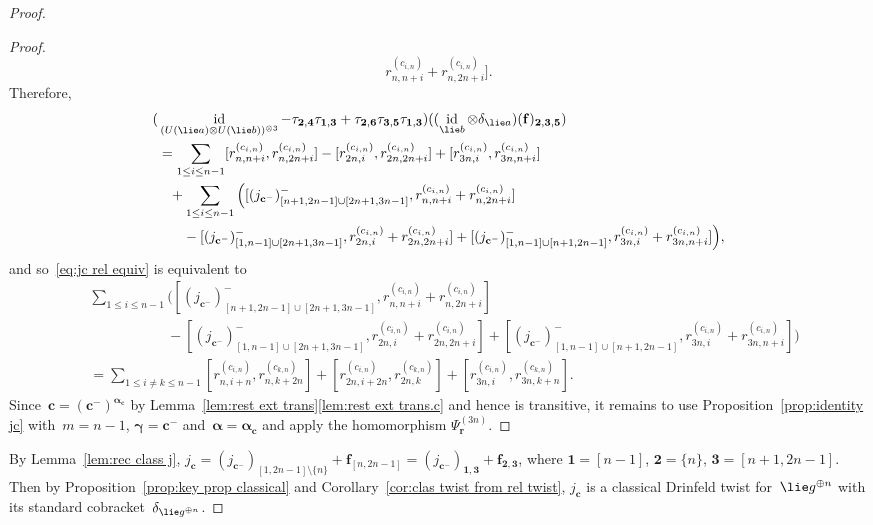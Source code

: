 \documentclass[12pt, reqno]{amsart}
\theoremstyle{definition}
\numberwithin{equation}{section}
\newcommand{\tensor}{\otimes}
\DeclareMathOperator{\id}{id}
\begin{document}
\begin{proof}
\begin{proof}
$$r_{n,n+i}^{(c_{i,n})}+r_{n,2n+i}^{(c_{i,n})}].
$$
Therefore,
\begin{align*}
(&\id_{(U(\lie a)\tensor U(\lie b))^{\tensor3}}-\tau_{\mathbf 2,\mathbf 4}\tau_{\mathbf 1,\mathbf 3}+\tau_{\mathbf 2,\mathbf 6}\tau_{\mathbf 3,\mathbf 5}\tau_{\mathbf 1,\mathbf 3})((\id_{\lie b}\tensor \delta_{\lie a})(\mathbf f)_{\mathbf 2,\mathbf 3,\mathbf 5})\\
&=\sum_{1\le i\le n-1} 
[r_{n,n+i}^{(c_{i,n})},r_{n,2n+i}^{(c_{i,n})}]-
[r_{2n,i}^{(c_{i,n})},r_{2n,2n+i}^{(c_{i,n})}]
+[r_{3n,i}^{(c_{i,n})},r_{3n,n+i}^{(c_{i,n})}]\\
&\phantom{=}+\sum_{1\le i\le n-1}\Big([( j_{\mathbf c^-})^-_{[n+1,2n-1]\cup[2n+1,3n-1]},
r_{n,n+i}^{(c_{i,n})}+r_{n,2n+i}^{(c_{i,n})}]\\
&\phantom{=}\quad-[( j_{\mathbf c^-})^-_{[1,n-1]\cup[2n+1,3n-1]},
r_{2n,i}^{(c_{i,n})}+r_{2n,2n+i}^{(c_{i,n})}]+[( j_{\mathbf c^-})^-_{[1,n-1]\cup[n+1,2n-1]},
r_{3n,i}^{(c_{i,n})}+r_{3n,n+i}^{(c_{i,n})}]\Big),
\end{align*}
and so~\eqref{eq:jc rel equiv} is equivalent to
\begin{align*}
&\sum_{1\le i\le n-1}\Big([( j_{\mathbf c^-})^-_{[n+1,2n-1]\cup[2n+1,3n-1]},
r_{n,n+i}^{(c_{i,n})}+r_{n,2n+i}^{(c_{i,n})}]\\
&\phantom{\sum_{1\le i\le n-1}}-[( j_{\mathbf c^-})^-_{[1,n-1]\cup[2n+1,3n-1]},
r_{2n,i}^{(c_{i,n})}+r_{2n,2n+i}^{(c_{i,n})}]+[( j_{\mathbf c^-})^-_{[1,n-1]\cup[n+1,2n-1]},
r_{3n,i}^{(c_{i,n})}+r_{3n,n+i}^{(c_{i,n})}]\Big)\\
&=\sum_{1\le i\not=k\le n-1} [r_{n,i+n}^{(c_{i,n})},r_{n,k+2n}^{(c_{k,n})}]+[r_{2n,i+2n}^{(c_{i,n})},r_{2n,k}^{(c_{k,n})}]+[r_{3n,i}^{(c_{i,n})},
r_{3n,k+n}^{(c_{k,n})}].
\end{align*}
Since~$\mathbf c=(\mathbf c^-)^{\boldsymbol{\alpha}_{\mathbf c}}$ by Lemma~\ref{lem:rest ext trans}\ref{lem:rest ext trans.c} and hence is transitive,
it remains to use Proposition~\ref{prop:identity jc} with~$m=n-1$, $\boldsymbol{\gamma}=\mathbf c^-$ and~$\boldsymbol{\alpha}=\boldsymbol{\alpha}_{\mathbf c}$ 
and apply the homomorphism $\Psi^{(3n)}_{\mathbf r}$.
\end{proof}
By Lemma~\ref{lem:rec class j}, $j_{\mathbf c}=(j_{\mathbf c^-})_{[1,2n-1]\setminus\{n\}}+\mathbf f_{[n,2n-1]}=(j_{\mathbf c^-})_{\mathbf 1,\mathbf 3}+
\mathbf f_{\mathbf 2,\mathbf 3}$, where $\mathbf 1=[n-1]$, $\mathbf 2=\{n\}$, $\mathbf 3=[n+1,2n-1]$.
Then by Proposition~\ref{prop:key prop classical} and Corollary~\ref{cor:clas twist from rel twist}, $j_{\mathbf c}$ is a classical Drinfeld twist for~$\lie g^{\oplus n}$ with its standard cobracket~$\delta_{\lie g^{\oplus n}}$.
\end{proof}
\end{document}
